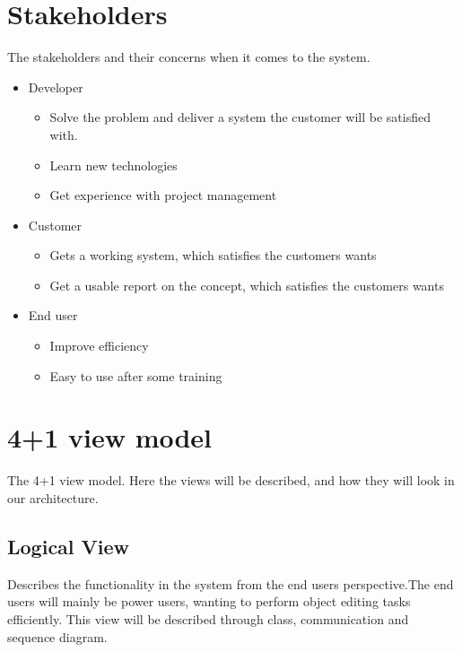 \section{Stakeholders}
The stakeholders and their concerns when it comes to the system.

\begin{itemize}
    \item Developer
    \begin{itemize}
        \item Solve the problem and deliver a system the customer will be satisfied with.
        \item Learn new technologies
        \item Get experience with project management
        \end{itemize}
    \item Customer
    \begin{itemize}
        \item Gets a working system, which satisfies the customers wants
        \item Get a usable report on the concept, which satisfies the customers wants
    \end{itemize}
    \item End user
    \begin{itemize}
        \item Improve efficiency
        \item Easy to use after some training
    \end{itemize}
\end{itemize}



\section{4+1 view model}
The 4+1 view model. Here the views will be described, and how they will look in our architecture. 

\subsection{Logical View}
Describes the functionality in the system from the end users perspective.The end users will mainly be power users, wanting to perform object editing tasks efficiently. This view will be described through class, communication and sequence diagram.

